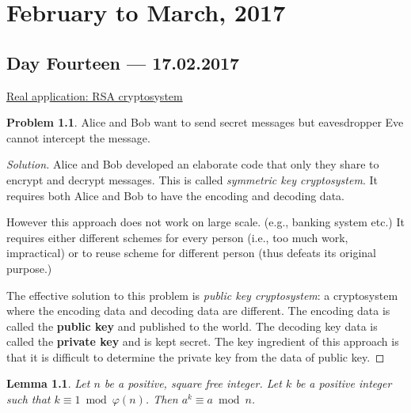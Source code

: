 \documentclass{amsbook}
\theoremstyle{plain}
\newtheorem{lemma}[theorem]{Lemma}
\theoremstyle{definition}
\newtheorem{problem}[theorem]{Problem}
\theoremstyle{remark}
\numberwithin{equation}{chapter}
\numberwithin{figure}{chapter}
\begin{document}
\part{February to March, 2017}\label{part2}

\chapter[Lecture Fourteen]{Day Fourteen \hfill {\footnotesize \rm --- 17.02.2017}}\label{chp:RSA}

\underline{Real a}pp\underline{lication: RSA cr}yp\underline{tos}y\underline{stem}
\begin{problem}
  Alice and Bob want to send secret messages but eavesdropper Eve cannot intercept the message.
\end{problem}
\begin{proof}[Solution]
  Alice and Bob developed an elaborate code that only they share to encrypt and decrypt messages. This is called \emph{symmetric key cryptosystem}. It requires both Alice and Bob to have the encoding and decoding data.

  However this approach does not work on large scale. (e.g., banking system etc.) It requires either different schemes for every person (i.e., too much work, impractical) or to reuse scheme for different person (thus defeats its original purpose.)

  The effective solution to this problem is \emph{public key cryptosystem}: a cryptosystem where the encoding data and decoding data are different. The encoding data is called the \textbf{public key} and published to the world. The decoding key data is called the \textbf{private key} and is kept secret. The key ingredient of this approach is that it is difficult to determine the private key from the data of public key.
\end{proof}
\begin{lemma}\label{lem:rsa}
  Let $n$ be a positive, square free integer. Let $k$ be a positive integer such that $k \equiv 1 \bmod \varphi(n)$. Then $a^k \equiv a \bmod n$.
\end{lemma}
\end{document}
